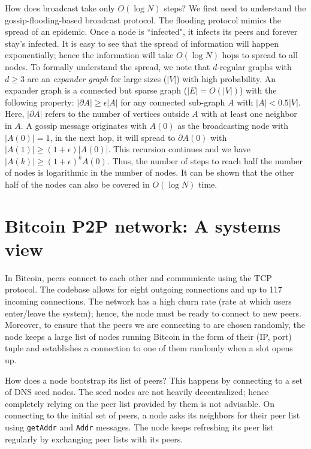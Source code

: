 \documentclass{article}
\begin{document}
How does broadcast take only $O(\log N)$ steps? We first need to understand the gossip-flooding-based broadcast protocol. The flooding protocol mimics the spread of an epidemic. Once a node is ``infected", it infects its peers and forever stay's infected. It is easy to see that the spread of information will happen exponentially; hence the information will take $O(\log N)$ hops to spread to all nodes. To formally understand the spread, we note that $d$-regular graphs with $d\geq 3$ are an \textit{expander graph} for large sizes ($|V|$) with high probability. An expander graph is a connected but sparse graph ($|E|=O(|V|)$) with the following property: $|\partial A| \geq \epsilon|A|$ for any connected sub-graph $A$ with $|A|<0.5|V|$. Here, $|\partial A|$ refers to the number of vertices outside $A$ with at least one neighbor in $A$. A gossip message originates with $A(0)$ as the broadcasting node with $|A(0)|=1$, in the next hop, it will spread to $\partial A(0)$ with $|A(1)|\geq (1+\epsilon)|A(0)|$. This recursion continues and we have $|A(k)|\geq(1+\epsilon)^kA(0)$. Thus, the number of steps to reach half the number of nodes is logarithmic in the number of nodes. It can be shown that the other half of the nodes can also be covered in $O(\log N)$ time.



\section*{Bitcoin P2P network: A systems view}
In Bitcoin, peers connect to each other and communicate using the TCP protocol. The codebase allows for eight outgoing connections and up to 117 incoming connections. The network has a high churn rate (rate at which users enter/leave the system); hence, the node must be ready to connect to new peers. Moreover, to ensure that the peers we are connecting to are chosen randomly, the node keeps a large list of nodes running Bitcoin in the form of their (IP, port) tuple and establishes a connection to one of them randomly when a slot opens up.  

How does a node bootstrap its list of peers? This happens by connecting to a set of DNS seed nodes. The seed nodes are not heavily decentralized; hence completely relying on the peer list provided by them is not advisable. On connecting to the initial set of peers, a node asks its neighbors for their peer list using {\tt getAddr} and {\tt Addr} messages. The node keeps refreshing its peer list regularly by exchanging peer lists with its peers. 
\end{document}
